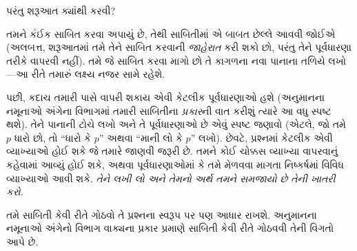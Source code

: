 \documentclass[../../../include/open-logic-section]{subfiles}
\begin{document}


પરંતુ શરૂઆત ક્યાંથી કરવી?

તમને કંઈક સાબિત કરવા અપાયું છે, તેથી સાબિતીમાં એ બાબત છેલ્લે
આવવી જોઈએ (અલબત્ત, શરૂઆતમાં તમે તેને સાબિત કરવાની \emph{જાહેરાત}
કરી શકો છો, પરંતુ તેને પૂર્વધારણા તરીકે વાપરવી નહીં). તમે જે
સાબિત કરવા માગો છો તે કાગળના નવા પાનાના તળિયે લખો---આ રીતે
તમારું લક્ષ્ય નજર સામે રહેશે.

પછી, કદાચ તમારી પાસે વાપરી શકાય એવી કેટલીક પૂર્વધારણાઓ હશે
(અનુમાનના નમૂનાઓ અંગેના વિભાગમાં તમારી સાબિતીના \emph{પ્રકાર}ની વાત કરીશું ત્યારે
આ વધુ સ્પષ્ટ થશે). તેને પાનાની ટોચે લખો અને તે પૂર્વધારણાઓ છે
એવું સ્પષ્ટ જણાવો (એટલે, જો તમે $p$ ધારો છો, તો ``ધારો કે $p$''
અથવા ``માની લો કે $p$'' લખો). છેવટે, પ્રશ્નમાં કેટલીક એવી
વ્યાખ્યાઓ હોઈ શકે જે તમારે જાણવી જરૂરી છે. તમને કોઈ ચોક્કસ
વ્યાખ્યા વાપરવાનું કહેવામાં આવ્યું હોઈ શકે, અથવા પૂર્વધારણાઓમાં
કે તમે મેળવવા માગતા નિષ્કર્ષમાં વિવિધ વ્યાખ્યાઓ આવી શકે.
\emph{તેને લખી લો અને તેમનો અર્થ તમને સમજાયો છે તેની ખાતરી કરો.}

તમે સાબિતી કેવી રીતે ગોઠવો તે પ્રશ્નના સ્વરૂપ પર પણ આધાર રાખશે.
અનુમાનના નમૂનાઓ અંગેનો વિભાગ વાક્યના પ્રકાર પ્રમાણે સાબિતી કેવી રીતે ગોઠવવી તેની
વિગતો આપે છે.
\end{document}
